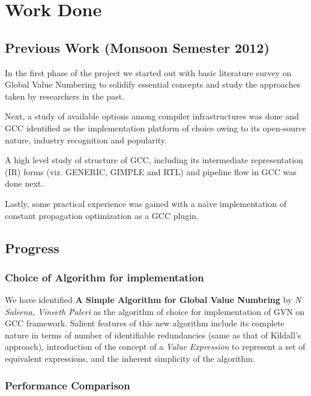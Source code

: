 \chapter{Work Done}

\section{Previous Work (Monsoon Semester 2012)}

In the first phase of the project we started out with basic literature survey on Global Value Numbering to solidify essential concepts and study the approaches taken by researchers in the past.

Next, a study of available options among compiler infrastructures was done and GCC\cite{gcc} identified as the implementation platform of choice owing to its open-source nature, industry recognition and popularity.

A high level study of structure of GCC, including its intermediate representation (IR) forms (viz. GENERIC\cite{generic}, GIMPLE\cite{gimple} and RTL\cite{rtl}) and pipeline flow in GCC was done next.

Lastly, some practical experience was gained with a na\"{\i}ve implementation of constant propagation optimization as a GCC plugin.

\section{Progress}

\subsection{Choice of Algorithm for implementation}

We have identified \textbf{A Simple Algorithm for Global Value Numbring} by \textit{N Saleena, Vineeth Paleri} as the algorithm of choice for implementation of GVN on GCC framework. Salient features of this new algorithm include its complete nature in terms of number of identifiable redundancies (same as that of Kildall's approach), introduction of the concept of a \textit{Value Expression} to represent a set of equivalent expressions, and the inherent simplicity of the algorithm.

\subsection{Performance Comparison}

